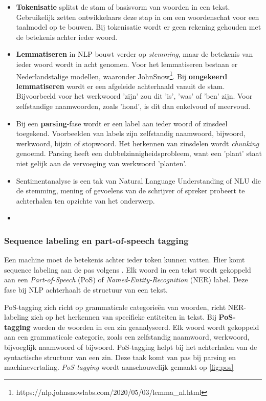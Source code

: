 \begin{itemize}
	\item \textbf{Tokenisatie} splitst de stam of basisvorm van woorden in een tekst. Gebruikelijk zetten ontwikkelaars deze stap in om een woordenschat voor een taalmodel op te bouwen. Bij tokenisatie wordt er geen rekening gehouden met de betekenis achter ieder woord.
	\item \textbf{Lemmatiseren} in NLP bouwt verder op \textit{stemming}, maar de betekenis van ieder woord wordt in acht genomen. Voor het lemmatiseren bestaan er Nederlandstalige modellen, waaronder JohnSnow\footnote{https://nlp.johnsnowlabs.com/2020/05/03/lemma\_nl.html}. Bij \textbf{omgekeerd lemmatiseren} wordt er een afgeleide achterhaald vanuit de stam. Bijvoorbeeld voor het werkwoord 'zijn' zou dit 'is', 'was' of 'ben' zijn. Voor zelfstandige naamwoorden, zoals 'hond', is dit dan enkelvoud of meervoud.
	\item Bij een \textbf{parsing}-fase wordt er een label aan ieder woord of zinsdeel toegekend. Voorbeelden van labels zijn zelfstandig naamwoord, bijwoord, werkwoord, bijzin of stopwoord. Het herkennen van zinsdelen wordt \textit{chunking} genoemd. Parsing heeft een dubbelzinnigheidsprobleem, want een 'plant' staat niet gelijk aan de vervoeging van werkwoord 'planten'.
	\item Sentimentanalyse is een tak van Natural Language Understanding of NLU die de stemming, mening of gevoelens van de schrijver of spreker probeert te achterhalen ten opzichte van het onderwerp. %
	\item 
	
\end{itemize}

\subsubsection{Sequence labeling en part-of-speech tagging}

Een machine moet de betekenis achter ieder token kunnen vatten. Hier komt sequence labeling aan de pas volgens \textcite{Eisenstein2019}. Elk woord in een tekst wordt gekoppeld aan een \textit{Part-of-Speech} (PoS) of \textit{Named-Entity-Recognition} (NER) label. Deze fase bij NLP achterhaalt de structuur van een tekst. 

PoS-tagging zich richt op grammaticale categorieën van woorden, richt NER-labeling zich op het herkennen van specifieke entiteiten in tekst. Bij \textbf{PoS-tagging} worden de woorden in een zin geanalyseerd. Elk woord wordt gekoppeld aan een grammaticale categorie, zoals een zelfstandig naamwoord, werkwoord, bijvoeglijk naamwoord of bijwoord. PoS-tagging helpt bij het achterhalen van de syntactische structuur van een zin. Deze taak komt van pas bij parsing en machinevertaling. \textit{PoS-tagging} wordt aanschouwelijk gemaakt op \ref{fig:pos}

